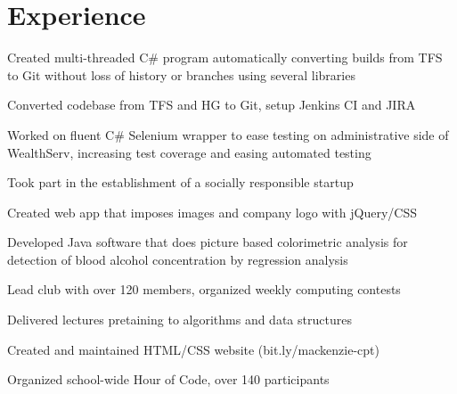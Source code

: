 \documentclass[]{deedy-resume-openfont}
\begin{document}
\begin{minipage}[t]{0.66\textwidth} 


\section{Experience}

\vspace{\topsep}
\begin{tightemize}
\item Created multi-threaded C\# program automatically converting builds from TFS to Git without loss of history or branches using several libraries
\item Converted codebase from TFS and HG to Git, setup Jenkins CI and JIRA
\item Worked on fluent C\# Selenium wrapper to ease testing on administrative side of WealthServ, increasing test coverage and easing automated testing
\end{tightemize}

\begin{tightemize}
\item Took part in the establishment of a socially responsible startup
\item Created web app that imposes images and company logo with jQuery/CSS
\item Developed Java software that does picture based colorimetric analysis for detection of blood alcohol concentration by regression analysis %
\end{tightemize}
\sectionsep

\begin{tightemize}
\item Lead club with over 120 members, organized weekly computing contests
\item Delivered lectures pretaining to algorithms and data structures
\item Created and maintained HTML/CSS website (bit.ly/mackenzie-cpt)
\item Organized school-wide Hour of Code, over 140 participants
\end{tightemize}
\sectionsep


\end{minipage}
\end{document}
